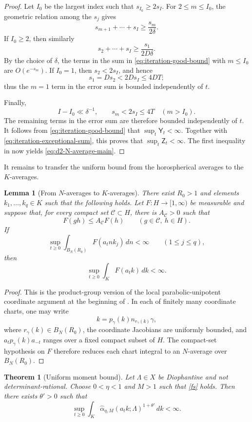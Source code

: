 \documentclass[reqno,11pt]{amsart}
\newtheorem{theorem}{Theorem}[section]
\newtheorem{lem}[lem]{Lemma}
\theoremstyle{definition}
\theoremstyle{remark}
\numberwithin{equation}{section}
\begin{document}
\begin{proof}
Let $I_0$ be the largest index such that $s_{I_0}\ge2s_I$. For
$2\le m\le I_0$, the geometric relation among the $s_j$ gives
$$
s_{m+1}+\cdots+s_I
\ge
\frac{s_m}{2\delta}.
$$
If $I_0\ge2$, then similarly
$$
s_2+\cdots+s_I
\ge
\frac{s_1}{2D\delta}.
$$
By the choice of $\delta$, the terms in the sum in
\eqref{eq:iteration-good-bound} with $m\le I_0$ are
$O(e^{-s_m})$. If $I_0=1$, then $s_2<2s_I$, and hence
$$
s_1=Ds_2<2Ds_I\le4DT;
$$
thus the $m=1$ term in the error sum is bounded independently of $t$.

Finally,
$$
I-I_0\ll\delta^{-1},
\qquad
s_m<2s_I\le4T
\quad
(m>I_0).
$$
The remaining terms in the error sum are therefore bounded independently
of $t$. It follows from \eqref{eq:iteration-good-bound} that
$\sup_t\mathsf Y_t<\infty$. Together with
\eqref{eq:iteration-exceptional-sum}, this proves that
$\sup_t\mathsf Z_t<\infty$. The first inequality in
 now yields
\eqref{eq:d2-N-average-main}.
\end{proof}

It remains to transfer the uniform bound from the horospherical averages
to the $K$-averages.

\begin{lem}[From $N$-averages to $K$-averages]
\label{lem:K-from-N-d2}
There exist $R_0>1$ and elements
$k_1,\ldots,k_q\in K$ such that the following holds.
Let $F:H\to[1,\infty)$ be measurable and suppose that, for every compact
set $\mathcal C\subset H$, there is $A_{\mathcal C}>0$ such that
\[
F(gh)\le A_{\mathcal C}F(h)
\qquad(g\in\mathcal C,\ h\in H).
\]
If
\[
\sup_{t\ge0}\int_{B_N(R_0)}F(a_tnk_j)\,dn<\infty
\qquad(1\le j\le q),
\]
then
\[
\sup_{t\ge0}\int_KF(a_tk)\,dk<\infty.
\]
\end{lem}

\begin{proof}
This is the product-group version of the local
parabolic-unipotent coordinate argument at the beginning of
\cite[Subsection~7.2]{Kim}. In each of finitely many coordinate charts,
one may write
$$
k=p_\gamma(k)n_{r_\gamma(k)}\gamma,
$$
where $r_\gamma(k)\in B_N(R_0)$, the coordinate Jacobians are uniformly
bounded, and
$a_tp_\gamma(k)a_{-t}$ ranges over a fixed compact subset of $H$.
The compact-set hypothesis on $F$ therefore reduces each chart integral to
an $N$-average over $B_N(R_0)$.
\end{proof}

\begin{theorem}[Uniform moment bound]
\label{thm:moment-d2}
Let $\Lambda\in X$ be Diophantine and not determinant-rational. Choose
$0<\eta<1$ and $M>1$ such that \eqref{fs} holds. Then there exists
$\theta'>0$ such that
$$
\sup_{t\ge0}
\int_K
\widehat\alpha_{\eta,M}(a_tk;\Lambda)^{1+\theta'}\,dk
<\infty.
$$
\end{theorem}
\end{document}
